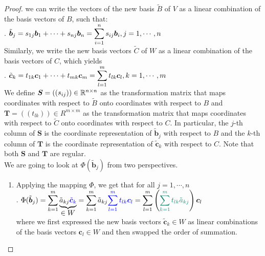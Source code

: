 \begin{enumerate}
    \begin{proof}
        we can write the vectors of the new basis $\tilde{B}$ of $V$ as a linear combination of the basis vectors of $B$, such that:
        \hfill \cite{mfml/book/mml/Deisenroth-Faisal-Ong}
        \\
        .\hfill
        $
            \tilde{\bm{b}}_j 
            = s_{1j} \bm{b}_1 + \cdots + s_{nj} \bm{b}_n 
            = \displaystyle\sum^n _{i=1} s_{ij} \bm{b}_i 
            , j = 1, \cdots , n
        $
        \hfill \cite{mfml/book/mml/Deisenroth-Faisal-Ong}
        \\
        Similarly, we write the new basis vectors $\tilde{C}$ of $W$ as a linear combination of the basis vectors of $C$, which yields
        \hfill \cite{mfml/book/mml/Deisenroth-Faisal-Ong}
        \\
        .\hfill
        $
            \tilde{\bm{c}}_k 
            = t_{1k} \bm{c}_1 + \cdots + t_{mk} \bm{c}_m 
            = \displaystyle\sum^m _{l=1} t_{lk} \bm{c}_l 
            , k = 1, \cdots , m
        $
        \hfill \cite{mfml/book/mml/Deisenroth-Faisal-Ong}
        \\
        We define $\bm{S} = ((s_{ij} )) \in \mathbb{R}^{n\times n}$ as the transformation matrix that maps coordinates with respect to $\tilde{B}$ onto coordinates with respect to $B$ and $\bm{T} = ((t_{lk})) \in R^{m\times m}$ as the transformation matrix that maps coordinates with respect to $\tilde{C}$ onto coordinates with respect to $C$. 
        In particular, the $j$-th column of $\bm{S}$ is the coordinate representation of $\tilde{\bm{b}}_j$ with respect to $B$ and the $k$-th column of $\bm{T}$ is the coordinate representation of $\tilde{\bm{c}}_k$ with respect to $C$. 
        Note that both $\bm{S}$ and $\bm{T}$ are regular.
        \hfill \cite{mfml/book/mml/Deisenroth-Faisal-Ong}
        \\
        We are going to look at $\Phi(\tilde{\bm{b}}_j )$ from two perspectives.
        \hfill \cite{mfml/book/mml/Deisenroth-Faisal-Ong}
        \begin{enumerate}
            \item Applying the mapping $\Phi$, we get that for all $j = 1, \cdots , n$
            \hfill \cite{mfml/book/mml/Deisenroth-Faisal-Ong}
            \\
            .\hfill
            $
                \Phi(\tilde{\bm{b}}_j )
                = \dsum^m_{k=1} \underset{\displaystyle \in W}{
                    \underbrace{\tilde{a}_{kj} \textcolor{blue}{\tilde{\bm{c}}_k}}
                }
                = \dsum^m_{k=1} \tilde{a}_{kj} \textcolor{blue}{
                    \dsum^m_{l=1} t_{lk} \bm{c}_l
                }
                = \dsum^m_{l=1} \dParenBrac{
                    \textcolor{PineGreen}{\dsum^m_{k=1} t_{lk} \tilde{a}_{kj}} 
                }  \bm{c}_l
            $
            \hfill \cite{mfml/book/mml/Deisenroth-Faisal-Ong}
            \\
            where we first expressed the new basis vectors $\tilde{\bm{c}}_k \in W$ as linear combinations of the basis vectors $\bm{c}_l \in W$ and then swapped the order of summation.
            \hfill \cite{mfml/book/mml/Deisenroth-Faisal-Ong}
    

\end{enumerate}
\end{proof}
\end{enumerate}
